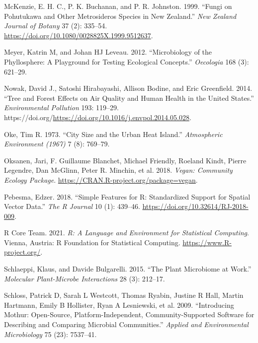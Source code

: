 \documentclass[fleqn,10pt,lineno]{wlpeerj} %
\newlength{\cslhangindent}
\newenvironment{CSLReferences}[2] %
 {%
  \setlength{\parindent}{0pt}
  \ifodd #1 \everypar{\setlength{\hangindent}{\cslhangindent}}\ignorespaces\fi
  \ifnum #2 > 0
  \setlength{\parskip}{#2\baselineskip}
  \fi
 }%
 {}
\begin{document}
\begin{CSLReferences}{1}{0}
\leavevmode{}%
McKenzie, E. H. C., P. K. Buchanan, and P. R. Johnston. 1999. {``Fungi on Pohutukawa and Other Metrosideros Species in New Zealand.''} \emph{New Zealand Journal of Botany} 37 (2): 335--54. \url{https://doi.org/10.1080/0028825X.1999.9512637}.

\leavevmode{}%
Meyer, Katrin M, and Johan HJ Leveau. 2012. {``Microbiology of the Phyllosphere: A Playground for Testing Ecological Concepts.''} \emph{Oecologia} 168 (3): 621--29.

\leavevmode{}%
Nowak, David J., Satoshi Hirabayashi, Allison Bodine, and Eric Greenfield. 2014. {``Tree and Forest Effects on Air Quality and Human Health in the United States.''} \emph{Environmental Pollution} 193: 119--29. https://doi.org/\url{https://doi.org/10.1016/j.envpol.2014.05.028}.

\leavevmode{}%
Oke, Tim R. 1973. {``City Size and the Urban Heat Island.''} \emph{Atmospheric Environment (1967)} 7 (8): 769--79.

\leavevmode{}%
Oksanen, Jari, F. Guillaume Blanchet, Michael Friendly, Roeland Kindt, Pierre Legendre, Dan McGlinn, Peter R. Minchin, et al. 2018. \emph{Vegan: Community Ecology Package}. \url{https://CRAN.R-project.org/package=vegan}.

\leavevmode{}%
Pebesma, Edzer. 2018. {``{Simple Features for R: Standardized Support for Spatial Vector Data}.''} \emph{{The R Journal}} 10 (1): 439--46. \url{https://doi.org/10.32614/RJ-2018-009}.

\leavevmode{}%
R Core Team. 2021. \emph{R: A Language and Environment for Statistical Computing}. Vienna, Austria: R Foundation for Statistical Computing. \url{https://www.R-project.org/}.

\leavevmode{}%
Schlaeppi, Klaus, and Davide Bulgarelli. 2015. {``The Plant Microbiome at Work.''} \emph{Molecular Plant-Microbe Interactions} 28 (3): 212--17.

\leavevmode{}%
Schloss, Patrick D, Sarah L Westcott, Thomas Ryabin, Justine R Hall, Martin Hartmann, Emily B Hollister, Ryan A Lesniewski, et al. 2009. {``Introducing Mothur: Open-Source, Platform-Independent, Community-Supported Software for Describing and Comparing Microbial Communities.''} \emph{Applied and Environmental Microbiology} 75 (23): 7537--41.


\end{CSLReferences}
\end{document}
